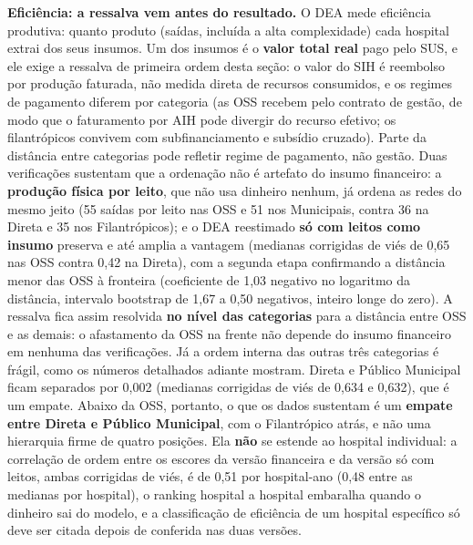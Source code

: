 \textbf{Eficiência: a ressalva vem antes do resultado.} O DEA mede
eficiência produtiva: quanto produto (saídas, incluída a alta
complexidade) cada hospital extrai dos seus insumos. Um dos insumos é
o \textbf{valor total real} pago pelo SUS, e ele exige a ressalva de
primeira ordem desta seção: o valor do SIH é reembolso por produção
faturada, não medida direta de recursos consumidos, e os regimes de
pagamento diferem por categoria (as OSS recebem pelo contrato de
gestão, de modo que o faturamento por AIH pode divergir do recurso
efetivo; os filantrópicos convivem com subfinanciamento e subsídio
cruzado). Parte da distância entre categorias pode refletir regime de
pagamento, não gestão. Duas verificações sustentam que a ordenação
não é artefato do insumo financeiro: a \textbf{produção física por
leito}, que não usa dinheiro nenhum, já ordena as redes do mesmo jeito
(55 saídas por leito nas OSS e 51 nos Municipais, contra 36 na Direta
e 35 nos Filantrópicos); e o DEA reestimado \textbf{só com leitos como
insumo} preserva e até amplia a vantagem (medianas corrigidas de viés
de 0,65 nas OSS contra 0,42 na Direta), com a segunda etapa
confirmando a distância
menor das OSS à fronteira (coeficiente de 1,03 negativo no logaritmo
da distância, intervalo bootstrap de 1,67 a 0,50 negativos, inteiro
longe do zero). A ressalva fica assim resolvida \textbf{no nível das
categorias} para a distância entre OSS e as demais: o afastamento da
OSS na frente não depende do insumo financeiro em nenhuma das
verificações. Já a ordem interna das outras três categorias é frágil,
como os números detalhados adiante mostram. Direta e Público Municipal
ficam separados por 0,002 (medianas corrigidas de viés de 0,634 e 0,632),
que é um empate. Abaixo da OSS, portanto, o que os dados sustentam é um
\textbf{empate entre Direta e Público Municipal}, com o
Filantrópico atrás, e não uma hierarquia firme de quatro posições. Ela
\textbf{não} se estende ao hospital individual: a correlação de ordem
entre os escores da versão financeira e da versão só com leitos, ambas
corrigidas de viés, é de 0,51 por hospital-ano (0,48 entre as medianas
por hospital), o ranking hospital a hospital embaralha quando o
dinheiro sai do modelo, e a classificação de eficiência de um hospital
específico só deve ser citada depois de conferida nas duas versões.

